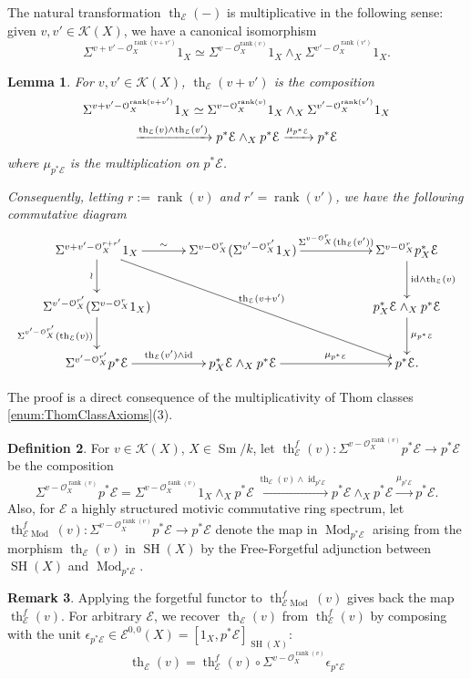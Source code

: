 \documentclass[10pt]{amsart}
\theoremstyle{definition}
\newtheorem{defn}{Definition}[section]
\newtheorem{rmk}[defn]{Remark}
\theoremstyle{plain}
\newtheorem{lemma}[defn]{Lemma}
\numberwithin{equation}{section}
\newcommand{\0}{\emptyset}
\newcommand{\sE}{{\mathcal E}}
\newcommand{\sK}{{\mathcal K}}
\newcommand{\sO}{{\mathcal O}}
\newcommand{\SH}{{\operatorname{SH}}}
\newcommand{\Sm}{{\operatorname{Sm}}}
\renewcommand{\th}{{\operatorname{th}}}
\newcommand{\Mod}{{\operatorname{Mod}}}
\newcommand{\rnk}{{\operatorname{rank}}}
\newcommand{\id}{{\operatorname{id}}}
\begin{document}
The natural transformation $\th_\sE(-)$ is multiplicative in the following sense: given $v,v'\in \sK(X)$, we have a canonical isomorphism
\[
\Sigma^{v+v'-\sO_X^{\rnk(v+v')}}1_X\simeq \Sigma^{v-\sO_X^{\text{rank}(v)}}1_X\wedge_X\Sigma^{v'-\sO_X^{\rnk(v')}}1_X.
\]

\begin{lemma}\label{lem:ThomMult}
For $v,v'\in \sK(X)$, $\th_\sE(v+v')$ is the composition
\begin{multline}\label{multline:ThomMult}
\Sigma^{v+v'-\sO_X^{\rnk(v+v')}}1_X\simeq \Sigma^{v-\sO_X^{\rnk(v)}}1_X\wedge_X\Sigma^{v'-\sO_X^{\rnk(v')}}
1_X\\\xrightarrow{\th_\sE(v)\wedge\th_\sE(v')}p^*\sE\wedge_Xp^*\sE\xrightarrow{\mu_{p^*\sE}} p^*\sE\notag
\end{multline}
where $\mu_{p^*\sE}$ is the multiplication on $p^*\sE$. 

Consequently, letting $r:=\rnk(v)$ and $r'=\rnk(v')$, we have the following commutative diagram
\[
\xymatrix{
\Sigma^{v+v'-\sO_X^{r+r'}}1_X\ar[ddrrr]^{\th_\sE(v+v')}\ar[d]_-\wr\ar[r]^-\sim&\Sigma^{v-\sO_X^r}(\Sigma^{v'-\sO_X^{r'}}1_X)\ar[rr]^-{\Sigma^{v-\sO_X^r}(\th_\sE(v'))}&&\Sigma^{v-\sO_X^r}p_X^*\sE\ar[d]^-{\id\wedge\th_\sE(v)}\\
\Sigma^{v'-\sO_X^{r'}}(\Sigma^{v-\sO_X^r}1_X)
\ar[d]_-{\Sigma^{v'-\sO_X^{r'}}(\th_\sE(v))}&&&p_X^*\sE\wedge_Xp^*\sE\ar[d]^-{\mu_{p^*\sE}}\\
\Sigma^{v'-\sO_X^{r'}}p^*\sE\ar[r]^-{\th_\sE(v')\wedge\id}&p_X^*\sE\wedge_Xp^*\sE\ar[rr]^-{\mu_{p^*\sE}}&&p^*\sE.
}
\]
\end{lemma}
The proof is a direct consequence of the multiplicativity of Thom classes \eqref{enum:ThomClassAxioms}(3).

\begin{defn} For $v\in \sK(X)$, $X\in \Sm/k$, let $\th_{\sE}^f(v):\Sigma^{v-\sO_X^{\rnk(v)}}p^*\sE\to p^*\sE$ be the composition  
\[
\Sigma^{v-\sO_X^{\rnk(v)}}p^*\sE=\Sigma^{v-\sO_X^{\rnk(v)}}1_X\wedge_Xp^*\sE\xrightarrow{\th_\sE(v)\wedge\id_{p^*\sE}}p^*\sE\wedge_X p^*\sE\xrightarrow{\mu_{p^*\sE}} p^*\sE.
\]
Also, for $\sE$ a highly structured motivic commutative ring spectrum, let $\th^f_{\sE\Mod}(v):\Sigma^{v-\sO_X^{\rnk(v)}}p^*\sE\to p^*\sE$ denote the map in $\Mod_{p^*\sE}$ arising from the morphism $\th_\sE(v)$ in $\SH(X)$ by the Free-Forgetful adjunction between $\SH(X)$ and $\Mod_{p^*\sE}$.
\end{defn}

\begin{rmk}
\label{rmk:th(-)&th_E(-)}
Applying the forgetful functor to $\th^f_{\sE\Mod}(v)$ gives back the map $\th_{\sE}^f(v)$. For arbitrary $\sE$, we recover $\th_\sE(v)$ from $\th_{\sE}^f(v)$ by composing with the unit $\epsilon_{p^*\sE}\in \sE^{0,0}(X)=[1_X,p^*\sE]_{\SH(X)}$:
\[
\th_\sE(v)=\th_{\sE}^f(v)\circ \Sigma^{v-\mathcal{O}_X^{\rnk(v)}}\epsilon_{p^*\sE}
\]
\end{rmk}
\end{document}
